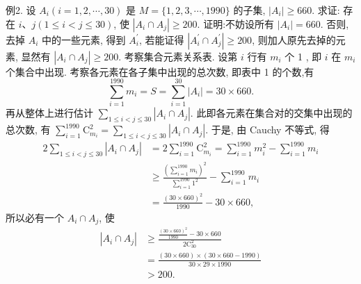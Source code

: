 例2. 设 $A_i(i=1,2, \cdots, 30)$ 是 $M=\{1,2,3, \cdots, 1990\}$ 的子集, $\left|A_i\right| \geqslant 660$. 求证: 存在 $i 、 j(1 \leqslant i<j \leqslant 30)$, 使 $\left|A_i \cap A_j\right| \geqslant 200$.
证明:不妨设所有 $\left|A_i\right|=660$. 否则, 去掉 $A_i$ 中的一些元素, 得到 $A_i^{\prime}$, 若能证得 $\left|A_i^{\prime} \cap A_j^{\prime}\right| \geqslant 200$, 则加人原先去掉的元素, 显然有 $\left|A_i \cap A_j\right| \geqslant 200$.
考察集合元素关系表.
设第 $i$ 行有 $m_i$ 个 1 , 即 $i$ 在 $m_i$ 个集合中出现.
考察各元素在各子集中出现的总次数, 即表中 1 的个数,有
$$
\sum_{i=1}^{1990} m_i=S=\sum_{i=1}^{30}\left|A_i\right|=30 \times 660 .
$$
再从整体上进行估计 $\sum_{1 \leqslant i<j \leqslant 30}\left|A_i \cap A_j\right|$. 此即各元素在集合对的交集中出现的总次数, 有 $\sum_{i=1}^{1990} \mathrm{C}_{m_i}^2=\sum_{1 \leqslant i<j \leqslant 30}\left|A_i \cap A_j\right|$.
于是, 由 Cauchy 不等式, 得
$$
\begin{aligned}
2 \sum_{1 \leqslant i<j \leqslant 30}\left|A_i \cap A_j\right| & =2 \sum_{i=1}^{1990} \mathrm{C}_{m_i}^2=\sum_{i=1}^{1990} m_i^2-\sum_{i=1}^{1990} m_i \\
& \geqslant \frac{\left(\sum_{i=1}^{1990} m_i\right)^2}{\sum_{i=1}^{1990} 1^2}-\sum_{i=1}^{1990} m_i \\
& =\frac{(30 \times 660)^2}{1990}-30 \times 660,
\end{aligned}
$$
所以必有一个 $A_i \cap A_j$, 使
$$
\begin{aligned}
\left|A_i \cap A_j\right| & \geqslant \frac{\frac{(30 \times 660)^2}{1990}-30 \times 660}{2 \mathrm{C}_{30}^2} \\
& =\frac{(30 \times 660) \times(30 \times 660-1990)}{30 \times 29 \times 1990} \\
& >200 .
\end{aligned}
$$



